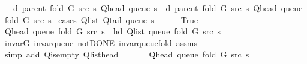 \begin{isabellebody}
\ \ \ {\isachardoublequoteopen}d\ {\isacharparenleft}{\kern0pt}parent\ {\isacharparenleft}{\kern0pt}fold\ G\ src\ s{\isacharparenright}{\kern0pt}{\isacharparenright}{\kern0pt}\ {\isacharparenleft}{\kern0pt}Q{\isacharunderscore}{\kern0pt}head\ {\isacharparenleft}{\kern0pt}queue\ s{\isacharparenright}{\kern0pt}{\isacharparenright}{\kern0pt}\ {\isasymle}\ d\ {\isacharparenleft}{\kern0pt}parent\ {\isacharparenleft}{\kern0pt}fold\ G\ src\ s{\isacharparenright}{\kern0pt}{\isacharparenright}{\kern0pt}\ {\isacharparenleft}{\kern0pt}Q{\isacharunderscore}{\kern0pt}head\ {\isacharparenleft}{\kern0pt}queue\ {\isacharparenleft}{\kern0pt}fold\ G\ src\ s{\isacharparenright}{\kern0pt}{\isacharparenright}{\kern0pt}{\isacharparenright}{\kern0pt}{\isachardoublequoteclose}\isanewline
%
\isadelimproof
%
\endisadelimproof
%
\isatagproof
{}\isamarkupfalse%
\ {\isacharparenleft}{\kern0pt}cases\ {\isachardoublequoteopen}Q{\isacharunderscore}{\kern0pt}list\ {\isacharparenleft}{\kern0pt}Q{\isacharunderscore}{\kern0pt}tail\ {\isacharparenleft}{\kern0pt}queue\ s{\isacharparenright}{\kern0pt}{\isacharparenright}{\kern0pt}\ {\isacharequal}{\kern0pt}\ {\isacharbrackleft}{\kern0pt}{\isacharbrackright}{\kern0pt}{\isachardoublequoteclose}{\isacharparenright}{\kern0pt}\isanewline
\ \ \isamarkupfalse%
\ True\isanewline
\ \ \isamarkupfalse%
\ {\isachardoublequoteopen}Q{\isacharunderscore}{\kern0pt}head\ {\isacharparenleft}{\kern0pt}queue\ {\isacharparenleft}{\kern0pt}fold\ G\ src\ s{\isacharparenright}{\kern0pt}{\isacharparenright}{\kern0pt}\ {\isacharequal}{\kern0pt}\ hd\ {\isacharparenleft}{\kern0pt}Q{\isacharunderscore}{\kern0pt}list\ {\isacharparenleft}{\kern0pt}queue\ {\isacharparenleft}{\kern0pt}fold\ G\ src\ s{\isacharparenright}{\kern0pt}{\isacharparenright}{\kern0pt}{\isacharparenright}{\kern0pt}{\isachardoublequoteclose}\isanewline
\ \ \ \ \isamarkupfalse%
\ invar{\isacharunderscore}{\kern0pt}G\ invar{\isacharunderscore}{\kern0pt}queue\ not{\isacharunderscore}{\kern0pt}DONE\ invar{\isacharunderscore}{\kern0pt}queue{\isacharunderscore}{\kern0pt}fold{\isacharunderscore}{\kern0pt}{}\ assms\isanewline
\ \ \ \ \isamarkupfalse%
\ {\isacharparenleft}{\kern0pt}simp\ add{\isacharcolon}{\kern0pt}\ Q{\isachardot}{\kern0pt}is{\isacharunderscore}{\kern0pt}empty\ Q{\isachardot}{\kern0pt}list{\isacharunderscore}{\kern0pt}head{\isacharparenright}{\kern0pt}\isanewline
\ \ \isamarkupfalse%
\isanewline
\ \ \ \ {\isachardoublequoteopen}Q{\isacharunderscore}{\kern0pt}head\ {\isacharparenleft}{\kern0pt}queue\ {\isacharparenleft}{\kern0pt}fold\ G\ src\ s{\isacharparenright}{\kern0pt}{\isacharparenright}{\kern0pt}\ {\isacharequal}{\kern0pt}\isanewline

\end{isabellebody}
